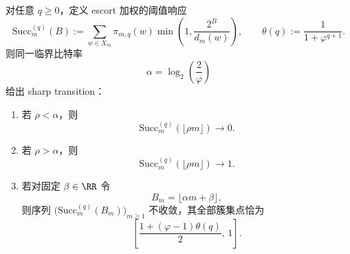 \begin{theorem}\label{thm:xi-time-part70d-escort-critical-response-band}
对任意 \(q\ge 0\)，定义 escort 加权的阈值响应
\[
\mathrm{Succ}_{m}^{(q)}(B)
:=
\sum_{w\in X_m}\pi_{m,q}(w)\min\!\left(1,\frac{2^B}{d_m(w)}\right),
\qquad
\theta(q):=\frac{1}{1+\varphi^{q+1}}.
\]
则同一临界比特率
\[
\alpha=\log_2\!\left(\frac{2}{\varphi}\right)
\]
给出 sharp transition：
\begin{enumerate}
  \item 若 \(\rho<\alpha\)，则
  \[
  \mathrm{Succ}_{m}^{(q)}(\lfloor \rho m\rfloor)\longrightarrow 0.
  \]
  \item 若 \(\rho>\alpha\)，则
  \[
  \mathrm{Succ}_{m}^{(q)}(\lfloor \rho m\rfloor)\longrightarrow 1.
  \]
  \item 若对固定 \(\beta\in\RR\) 令
  \[
  B_m=\lfloor \alpha m+\beta\rfloor,
  \]
  则序列 \(\bigl(\mathrm{Succ}_{m}^{(q)}(B_m)\bigr)_{m\ge 1}\) 不收敛，其全部簇集点恰为
  \[
  \left[\frac{1+(\varphi-1)\theta(q)}{2},\,1\right].
  \]
\end{enumerate}
\end{theorem}
